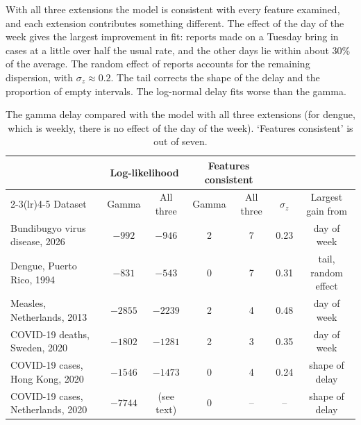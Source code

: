\documentclass[11pt,a4paper]{article}
\begin{document}
With all three extensions the model is consistent with every feature examined,
and each extension contributes something different. The effect of the day of
the week gives the largest improvement in fit: reports made on a Tuesday bring
in cases at a little over half the usual rate, and the other days lie within
about 30\% of the average. The random effect of reports accounts for the
remaining dispersion, with $\sigma_z\approx0.2$. The tail corrects the shape of
the delay and the proportion of empty intervals. The log-normal delay fits
worse than the gamma.

\begin{table}[h]
\centering
\begin{tabular}{lcccccc}
\toprule
 & \multicolumn{2}{c}{Log-likelihood} & \multicolumn{2}{c}{Features consistent} & & \\
\cmidrule(lr){2-3}\cmidrule(lr){4-5}
Dataset & Gamma & All three & Gamma & All three & $\sigma_z$ & Largest gain from \\
\midrule
Bundibugyo virus disease, 2026 & $-992$ & $-946$ & 2 & 7 & 0.23 & day of week \\
Dengue, Puerto Rico, 1994 & $-831$ & $-543$ & 0 & 7 & 0.31 & tail, random effect \\
Measles, Netherlands, 2013 & $-2855$ & $-2239$ & 2 & 4 & 0.48 & day of week \\
COVID-19 deaths, Sweden, 2020 & $-1802$ & $-1281$ & 2 & 3 & 0.35 & day of week \\
COVID-19 cases, Hong Kong, 2020 & $-1546$ & $-1473$ & 0 & 4 & 0.24 & shape of delay \\
COVID-19 cases, Netherlands, 2020 & $-7744$ & (see text) & 0 & -- & -- & shape of delay \\
\bottomrule
\end{tabular}
\caption{The gamma delay compared with the model with all three extensions
(for dengue, which is weekly, there is no effect of the day of the week).
`Features consistent' is out of seven.}
\label{tab:reportingmodelsall}
\end{table}
\end{document}
